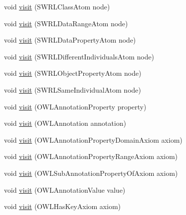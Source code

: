 \begin{DoxyCompactItemize}
\item 
void \hyperlink{classorg_1_1coode_1_1owlapi_1_1latex_1_1_latex_object_visitor_a85b507813d3ac9c599fbd21ee5f75e47}{visit} (S\-W\-R\-L\-Class\-Atom node)
\item 
void \hyperlink{classorg_1_1coode_1_1owlapi_1_1latex_1_1_latex_object_visitor_a5c3874afcb4583b69f1a50a5778a8814}{visit} (S\-W\-R\-L\-Data\-Range\-Atom node)
\item 
void \hyperlink{classorg_1_1coode_1_1owlapi_1_1latex_1_1_latex_object_visitor_a9da2bdb49c29e1373c27b28f23a225a1}{visit} (S\-W\-R\-L\-Data\-Property\-Atom node)
\item 
void \hyperlink{classorg_1_1coode_1_1owlapi_1_1latex_1_1_latex_object_visitor_a273d8c30a5c0600fa808206b28de635d}{visit} (S\-W\-R\-L\-Different\-Individuals\-Atom node)
\item 
void \hyperlink{classorg_1_1coode_1_1owlapi_1_1latex_1_1_latex_object_visitor_a1e3fd05386419c749153616466ff1e52}{visit} (S\-W\-R\-L\-Object\-Property\-Atom node)
\item 
void \hyperlink{classorg_1_1coode_1_1owlapi_1_1latex_1_1_latex_object_visitor_abdddb2450dcae6198f9e5910961e5d69}{visit} (S\-W\-R\-L\-Same\-Individual\-Atom node)
\item 
void \hyperlink{classorg_1_1coode_1_1owlapi_1_1latex_1_1_latex_object_visitor_a0884645967008fe06cc2a59ed48f7123}{visit} (O\-W\-L\-Annotation\-Property property)
\item 
void \hyperlink{classorg_1_1coode_1_1owlapi_1_1latex_1_1_latex_object_visitor_abc3aa87c69e0445857d68c1c4bccd459}{visit} (O\-W\-L\-Annotation annotation)
\item 
void \hyperlink{classorg_1_1coode_1_1owlapi_1_1latex_1_1_latex_object_visitor_aa23fb60d3cd10098077b40ca2f67dd2c}{visit} (O\-W\-L\-Annotation\-Property\-Domain\-Axiom axiom)
\item 
void \hyperlink{classorg_1_1coode_1_1owlapi_1_1latex_1_1_latex_object_visitor_a5ca6a9a6e8bddc095b3d968691a4aad5}{visit} (O\-W\-L\-Annotation\-Property\-Range\-Axiom axiom)
\item 
void \hyperlink{classorg_1_1coode_1_1owlapi_1_1latex_1_1_latex_object_visitor_a40efb3106a12bf5221737530a893cf28}{visit} (O\-W\-L\-Sub\-Annotation\-Property\-Of\-Axiom axiom)
\item 
void \hyperlink{classorg_1_1coode_1_1owlapi_1_1latex_1_1_latex_object_visitor_ae17e855564511f0da1db65827e2dbc79}{visit} (O\-W\-L\-Annotation\-Value value)
\item 
void \hyperlink{classorg_1_1coode_1_1owlapi_1_1latex_1_1_latex_object_visitor_a1496f7a5ffc95c43c8f13b967789c703}{visit} (O\-W\-L\-Has\-Key\-Axiom axiom)

\end{DoxyCompactItemize}
